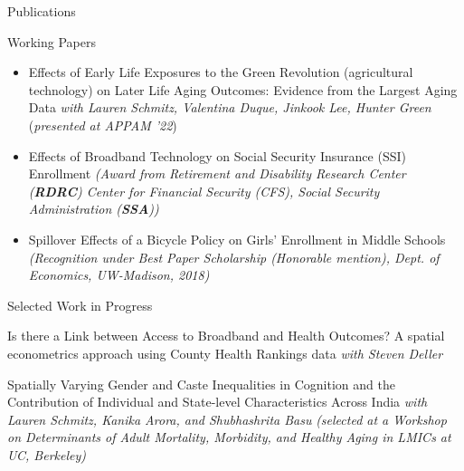 \documentclass{resume} %
\begin{document}
\begin{rSection}{Publications}
\begin{itemize}
\end{itemize}


\begin{rSection}{Working Papers}
\begin{itemize}
\item Effects of Early Life Exposures to the Green Revolution (agricultural technology) on Later Life Aging Outcomes: Evidence from the Largest Aging Data \textit{with Lauren Schmitz, Valentina Duque, Jinkook Lee, Hunter Green} (\textit{\scriptsize{presented at APPAM '22}}) 

\item Effects of Broadband Technology on Social Security Insurance (SSI) Enrollment \textit{\scriptsize{(Award from Retirement and Disability Research Center (\textbf{RDRC}) Center for Financial Security (CFS), Social Security Administration (\textbf{SSA}))}}

\item Spillover Effects of a Bicycle Policy on Girls' Enrollment in Middle Schools \textit{\scriptsize{(Recognition under Best Paper Scholarship (Honorable mention), Dept. of Economics, UW-Madison, 2018) }}


\end{itemize}








\end{rSection}


\begin{rSection}{Selected Work in Progress}

\item Is there a Link between Access to Broadband and Health Outcomes? A spatial econometrics approach using County Health Rankings data \textit{with Steven Deller}

\item Spatially Varying Gender and Caste Inequalities in Cognition and the Contribution of Individual and State-level Characteristics Across India \textit{with Lauren Schmitz, Kanika Arora, and Shubhashrita Basu} \textit{\scriptsize{(selected at a Workshop on Determinants of Adult Mortality, Morbidity, and Healthy Aging in LMICs at UC, Berkeley)}}


\end{rSection}
\end{rSection}
\end{document}
